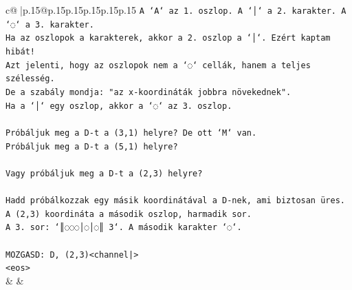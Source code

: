 \documentclass{article}
\begin{document}
{\begin{supertabular}{c@{$\;$}|p{.15\linewidth}@{}p{.15\linewidth}p{.15\linewidth}p{.15\linewidth}p{.15\linewidth}p{.15\linewidth}}
{{{\texttt{A `A` az 1. oszlop. A `│` a 2. karakter. A `◌` a 3. karakter.} \\
\texttt{Ha az oszlopok a karakterek, akkor a 2. oszlop a `│`. Ezért kaptam hibát!} \\
\texttt{Azt jelenti, hogy az oszlopok nem a `◌` cellák, hanem a teljes szélesség.} \\
\texttt{De a szabály mondja: "az x{-}koordináták jobbra növekednek".} \\
\texttt{Ha a `│` egy oszlop, akkor a `◌` az 3. oszlop.} \\
\\ 
\texttt{Próbáljuk meg a D{-}t a (3,1) helyre? De ott `M` van.} \\
\texttt{Próbáljuk meg a D{-}t a (5,1) helyre?} \\
\\ 
\texttt{Vagy próbáljuk meg a D{-}t a (2,3) helyre?} \\
\\ 
\texttt{Hadd próbálkozzak egy másik koordinátával a D{-}nek, ami biztosan üres.} \\
\texttt{A (2,3) koordináta a második oszlop, harmadik sor.} \\
\texttt{A 3. sor: `║◌◌◌│◌│◌║ 3`. A második karakter `◌`.} \\
\\ 
\texttt{MOZGASD: D, (2,3)<channel|>} \\
\texttt{<eos>} \\
            }
        }
    }
    & & \\ \\


\end{supertabular}}
\end{document}
